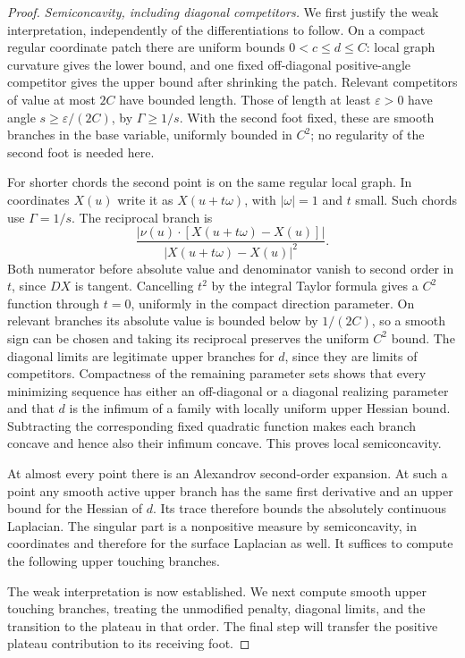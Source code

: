 \begin{proof}
\emph{Semiconcavity, including diagonal competitors.}
We first justify the weak interpretation, independently of the
differentiations to follow.  On a compact regular coordinate patch
there are uniform bounds $0<c\le d\le C$: local graph curvature
gives the lower bound, and one fixed off-diagonal positive-angle
competitor gives the upper bound after shrinking the patch.
Relevant competitors of value at most $2C$ have bounded length.
Those of length at least $\varepsilon>0$ have angle
$s\ge\varepsilon/(2C)$, by $\Gamma\ge1/s$.  With the second foot
fixed, these are smooth branches in the base variable, uniformly
bounded in $C^2$; no regularity of the second foot is needed here.

For shorter chords the second point is on the same regular local
graph.  In coordinates $X(u)$ write it as $X(u+t\omega)$, with
$|\omega|=1$ and $t$ small.  Such chords use $\Gamma=1/s$.
The reciprocal branch is
\[
 \frac{|\nu(u)\cdot[X(u+t\omega)-X(u)]|}
 {|X(u+t\omega)-X(u)|^2}.
\]
Both numerator before absolute value and denominator vanish to
second order in $t$, since $DX$ is tangent.  Cancelling $t^2$ by
the integral Taylor formula gives a $C^2$ function through $t=0$,
uniformly in the compact direction parameter.  On relevant branches
its absolute value is bounded below by $1/(2C)$, so a smooth sign
can be chosen and taking its reciprocal preserves the uniform
$C^2$ bound.  The diagonal limits are legitimate upper branches
for $d$, since they are limits of competitors.  Compactness of the
remaining parameter sets shows that every minimizing sequence
has either an off-diagonal or a diagonal realizing parameter and
that $d$ is the infimum of a family with locally uniform upper
Hessian bound.  Subtracting the corresponding fixed quadratic
function makes each branch concave and hence also their infimum
concave.  This proves local semiconcavity.

At almost every point there is an Alexandrov second-order expansion.
At such a point any smooth active upper branch has the same first
derivative and an upper bound for the Hessian of $d$.  Its trace
therefore bounds the absolutely continuous Laplacian.  The singular
part is a nonpositive measure by semiconcavity, in coordinates and
therefore for the surface Laplacian as well.  It suffices to compute
the following upper touching branches.

The weak interpretation is now established.  We next compute smooth
upper touching branches, treating the unmodified penalty, diagonal
limits, and the transition to the plateau in that order.  The final
step will transfer the positive plateau contribution to its receiving
foot.


\end{proof}
